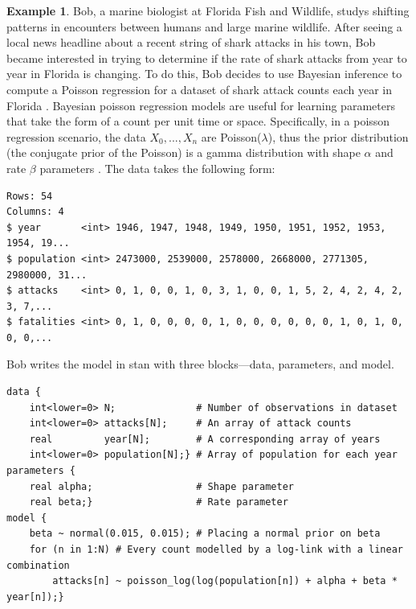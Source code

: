 \documentclass[
  12pt,
]{book}
\theoremstyle{definition}
\theoremstyle{definition}
\newtheorem{example}{Example}[chapter]
\theoremstyle{definition}
\theoremstyle{remark}
\begin{document}
\begin{example}
\protect\hypertarget{exm:stan}{}{\label{exm:stan} }Bob, a marine biologist at Florida Fish and Wildlife, studys shifting patterns in encounters between humans and large marine wildlife.
After seeing a local news headline about a recent string of shark attacks in his town, Bob became interested in trying to determine if the rate of shark attacks from year to year in Florida is changing. To do this, Bob decides to use Bayesian inference to compute a Poisson regression for a dataset of shark attack counts each year in Florida \citep{Collier2018}. Bayesian poisson regression models are useful for learning parameters that take the form of a count per unit time or space. Specifically, in a poisson regression scenario, the data \(X_0,...,X_n\) are Poisson(\(\lambda\)), thus the prior distribution (the conjugate prior of the Poisson) is a gamma distribution with shape \(\alpha\) and rate \(\beta\) parameters \citep{Hitchcock2014}. The data takes the following form:
\end{example}

\begin{verbatim}
Rows: 54
Columns: 4
$ year       <int> 1946, 1947, 1948, 1949, 1950, 1951, 1952, 1953, 1954, 19...
$ population <int> 2473000, 2539000, 2578000, 2668000, 2771305, 2980000, 31...
$ attacks    <int> 0, 1, 0, 0, 1, 0, 3, 1, 0, 0, 1, 5, 2, 4, 2, 4, 2, 3, 7,...
$ fatalities <int> 0, 1, 0, 0, 0, 0, 1, 0, 0, 0, 0, 0, 0, 1, 0, 1, 0, 0, 0,...
\end{verbatim}

Bob writes the model in stan with three blocks---data, parameters, and model.

\begin{verbatim}
data {
    int<lower=0> N;              # Number of observations in dataset
    int<lower=0> attacks[N];     # An array of attack counts
    real         year[N];        # A corresponding array of years
    int<lower=0> population[N];} # Array of population for each year
parameters {
    real alpha;                  # Shape parameter
    real beta;}                  # Rate parameter
model {
    beta ~ normal(0.015, 0.015); # Placing a normal prior on beta
    for (n in 1:N) # Every count modelled by a log-link with a linear combination
        attacks[n] ~ poisson_log(log(population[n]) + alpha + beta * year[n]);}
\end{verbatim}
\end{document}
